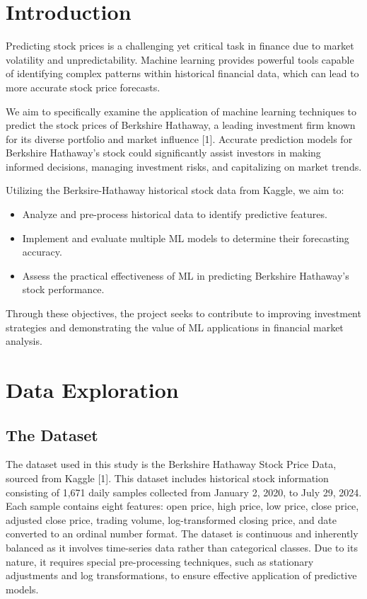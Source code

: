 \documentclass[conference]{IEEEtran}
\begin{document}
\section{Introduction}
Predicting stock prices is a challenging yet critical task in finance due to market volatility and unpredictability. Machine learning provides powerful tools capable of identifying complex patterns within historical financial data, which can lead to more accurate stock price forecasts.

We aim to specifically examine the application of machine learning techniques to predict the stock prices of Berkshire Hathaway, a leading investment firm known for its diverse portfolio and market influence [1]. Accurate prediction models for Berkshire Hathaway's stock could significantly assist investors in making informed decisions, managing investment risks, and capitalizing on market trends.

Utilizing the Berksire-Hathaway historical stock data from Kaggle, we aim to:
\begin{itemize}
    \item Analyze and pre-process historical data to identify predictive features.
    \item Implement and evaluate multiple ML models to determine their forecasting accuracy.
    \item Assess the practical effectiveness of ML in predicting Berkshire Hathaway’s stock performance.
\end{itemize}

Through these objectives, the project seeks to contribute to improving investment strategies and demonstrating the value of ML applications in financial market analysis.

\section{Data Exploration}

\subsection{The Dataset}

The dataset used in this study is the Berkshire Hathaway Stock Price Data, sourced from Kaggle [1]. This dataset includes historical stock information consisting of 1,671 daily samples collected from January 2, 2020, to July 29, 2024. Each sample contains eight features: open price, high price, low price, close price, adjusted close price, trading volume, log-transformed closing price, and date converted to an ordinal number format. The dataset is continuous and inherently balanced as it involves time-series data rather than categorical classes. Due to its nature, it requires special pre-processing techniques, such as stationary adjustments and log transformations, to ensure effective application of predictive models.
\end{document}
